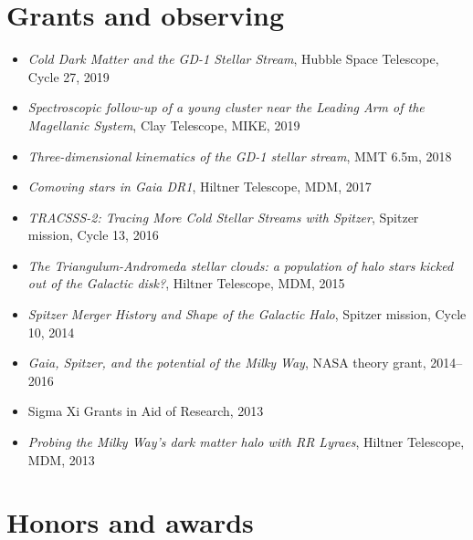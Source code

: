 \documentclass[12pt, letterpaper]{apw-cv}
\begin{document}
\section*{Grants and observing}

    \begin{itemize}
    \item {\it Cold Dark Matter and the GD-1 Stellar Stream}, Hubble Space Telescope, Cycle 27, 2019
    \item {\it Spectroscopic follow-up of a young cluster near the Leading Arm of the Magellanic System}, Clay Telescope, MIKE, 2019
    \item {\it Three-dimensional kinematics of the GD-1 stellar stream}, MMT 6.5m, 2018 %
    \item {\it Comoving stars in Gaia DR1}, Hiltner Telescope, MDM, 2017 %
    \item {\it TRACSSS-2: Tracing More Cold Stellar Streams with Spitzer}, Spitzer mission, Cycle 13, 2016 %
	\item {\it The Triangulum-Andromeda stellar clouds: a population of halo stars kicked out of the Galactic disk?}, Hiltner Telescope, MDM, 2015 %
	\item {\it Spitzer Merger History and Shape of the Galactic Halo}, Spitzer mission, Cycle 10, 2014 %
	\item {\it Gaia, Spitzer, and the potential of the Milky Way}, NASA theory grant, 2014--2016 %
	\item Sigma Xi Grants in Aid of Research, 2013 %
	\item {\it Probing the Milky Way's dark matter halo with RR Lyraes}, Hiltner Telescope, MDM, 2013 %
	\end{itemize}

\section*{Honors and awards}
\end{document}
